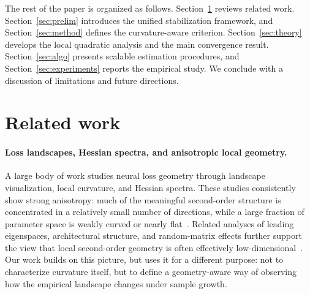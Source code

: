 \documentclass[10pt]{article}
\theoremstyle{plain}
\theoremstyle{remark}
\begin{document}
The rest of the paper is organized as follows.
Section~\ref{sec:related} reviews related work.
Section~\ref{sec:prelim} introduces the unified stabilization framework, and Section~\ref{sec:method} defines the curvature-aware criterion.
Section~\ref{sec:theory} develops the local quadratic analysis and the main convergence result.
Section~\ref{sec:algo} presents scalable estimation procedures, and Section~\ref{sec:experiments} reports the empirical study.
We conclude with a discussion of limitations and future directions.

\section{Related work}
\label{sec:related}

\paragraph{Loss landscapes, Hessian spectra, and anisotropic local geometry.}
A large body of work studies neural loss geometry through landscape visualization, local curvature, and Hessian spectra.
These studies consistently show strong anisotropy: much of the meaningful second-order structure is concentrated in a relatively small number of directions, while a large fraction of parameter space is weakly curved or nearly flat~\citep{li2018visualizing,sagun2017hessian,ghorbani2019investigation,papyan2019fullspectrum,xu2024mining}.
Related analyses of leading eigenspaces, architectural structure, and random-matrix effects further support the view that local second-order geometry is often effectively low-dimensional~\citep{wu2021dissecting,singh2023hessian,baskerville2021rmt,meshkov2024convnets}.
Our work builds on this picture, but uses it for a different purpose: not to characterize curvature itself, but to define a geometry-aware way of observing how the empirical landscape changes under sample growth.
\end{document}
